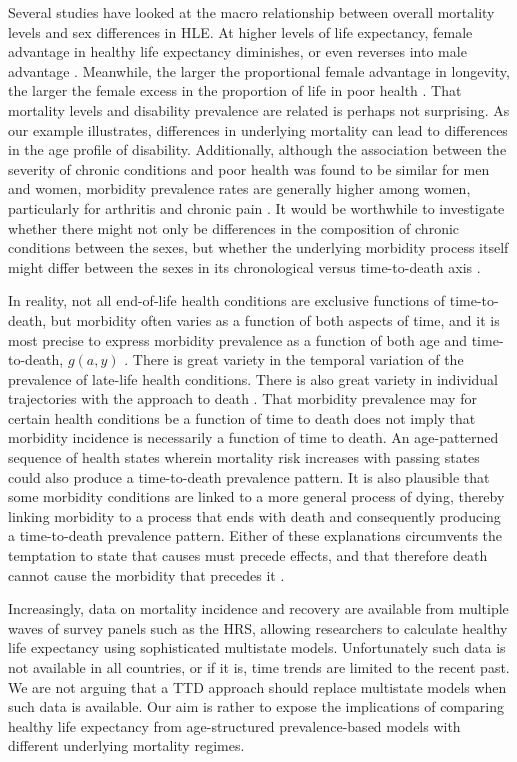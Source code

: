 \documentclass[11pt,oneside,a4paper]{article} %
\begin{document}
Several studies have looked at the macro relationship between overall mortality
levels and sex differences in HLE. At higher levels of life expectancy, female
advantage in healthy life expectancy diminishes, or even reverses into male
advantage \citep{vanOyen2013}. Meanwhile, the larger the proportional female
advantage in longevity, the larger the female excess in the proportion of life
in poor health \citep{Luy2014}. That mortality levels and disability prevalence
are related is perhaps not surprising. As our example illustrates, differences
in underlying mortality can lead to differences in the age profile of
disability.
Additionally, although the association between the severity of chronic conditions and poor health was found
to be similar for men and women, morbidity prevalence rates are generally higher
among women, particularly for arthritis and chronic pain \citep{Case2005}. It
would be worthwhile to investigate whether there might not only be differences
in the composition of chronic conditions between the sexes, but whether the
underlying morbidity process itself might differ between the sexes in its
chronological versus time-to-death axis \citep{riffe2015ttd}.

In reality, not all end-of-life health conditions are exclusive functions of
time-to-death, but morbidity often varies as a function of
both aspects of time, and it is most precise to express morbidity prevalence
as a function of both age and time-to-death, $g(a,y)$
\citep{wolf2015disability,riffe2015ttd}.
There is great variety in the temporal variation of the prevalence of late-life
health conditions. There is also great variety in individual trajectories with
the approach to death \citep{lunney2003patterns}. That morbidity prevalence may for certain health conditions be a function of
time to death does not imply that morbidity incidence is necessarily a function of time to death. An
age-patterned sequence of health states wherein mortality risk increases with
passing states could also produce a time-to-death prevalence pattern. It is also
plausible that some morbidity conditions are linked to a more general process of
dying, thereby linking morbidity to a process that ends with death and
consequently producing a time-to-death prevalence pattern. Either of these explanations circumvents the
temptation to state that causes must precede effects, and that therefore death cannot cause the morbidity that
precedes it \citep{lynch2015commentary}. 

Increasingly, data on mortality incidence and recovery are available from
multiple waves of survey panels such as the HRS, allowing researchers to
calculate healthy life expectancy using sophisticated multistate models.
Unfortunately such data is not available in all countries, or if it is, time
trends are limited to the recent past. We are not arguing that a TTD approach
should replace multistate models when such data is available. Our aim is rather
to expose the implications of comparing healthy life expectancy from
age-structured prevalence-based models with different underlying mortality
regimes.
\end{document}
